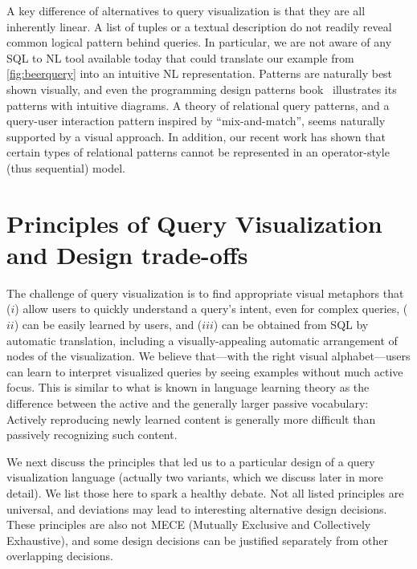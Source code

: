 \documentclass[letterpaper,11pt]{article}
\begin{document}
A key difference of alternatives to query visualization is 
that they are all inherently linear.
A list of tuples or a textual description do not readily reveal common logical pattern behind queries.
In particular, we are not aware of any SQL to NL tool available today that could translate our example from 
\autoref{fig:beerquery}
into an intuitive NL representation.
Patterns are naturally best shown visually,
%
and even the programming design patterns book~\cite{Gamma:1995ys} illustrates its patterns with intuitive diagrams.
A theory of relational query patterns, and a query-user interaction pattern inspired by ``mix-and-match'',
seems naturally supported by a visual approach.
In addition, our recent work \cite{relationalDiagrams} has shown that certain types of relational patterns 
cannot be represented in an operator-style (thus sequential) model.


%











\section{Principles of Query Visualization and Design trade-offs} 
\label{sec:2}



%
%
The challenge of query visualization is to find appropriate visual metaphors 
that ($i$) allow users to quickly understand a query's intent, even for complex queries,
($ii$) can be easily learned by users,
and ($iii$) can be obtained from SQL by automatic translation, including a visually-appealing automatic arrangement of nodes of the visualization.
We believe that---with the right visual alphabet---users can learn to interpret visualized queries by seeing examples without much active focus. This is similar to what is known in language learning theory as the difference between the active and the generally larger passive vocabulary: Actively reproducing newly learned content is generally more difficult than passively recognizing such content. 


We next discuss the principles that led us to a particular design of a query visualization language (actually two variants, which we discuss later in more detail). We list those here to spark a healthy debate. Not all listed principles are universal, and deviations may lead to interesting alternative design decisions. These principles are also not MECE (Mutually Exclusive and Collectively Exhaustive), and some design decisions can be justified separately from other overlapping decisions.
\end{document}

